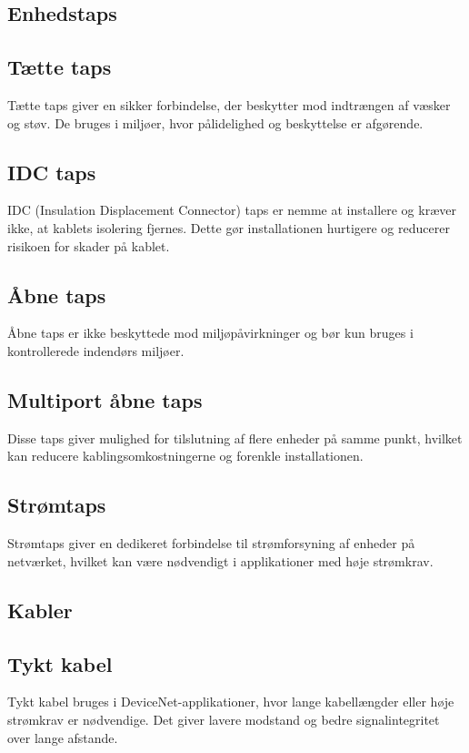 \subsection{Enhedstaps}
\subsection*{Tætte taps}
Tætte taps giver en sikker forbindelse, der beskytter mod indtrængen af væsker og støv. De bruges i miljøer, hvor pålidelighed og beskyttelse er afgørende.

\subsection*{IDC taps}
IDC (Insulation Displacement Connector) taps er nemme at installere og kræver ikke, at kablets isolering fjernes. Dette gør installationen hurtigere og reducerer risikoen for skader på kablet.

\subsection*{Åbne taps}
Åbne taps er ikke beskyttede mod miljøpåvirkninger og bør kun bruges i kontrollerede indendørs miljøer.

\subsection*{Multiport åbne taps}
Disse taps giver mulighed for tilslutning af flere enheder på samme punkt, hvilket kan reducere kablingsomkostningerne og forenkle installationen.

\subsection*{Strømtaps}
Strømtaps giver en dedikeret forbindelse til strømforsyning af enheder på netværket, hvilket kan være nødvendigt i applikationer med høje strømkrav.

\subsection{Kabler}
\subsection*{Tykt kabel}
Tykt kabel bruges i DeviceNet-applikationer, hvor lange kabellængder eller høje strømkrav er nødvendige. Det giver lavere modstand og bedre signalintegritet over lange afstande.

